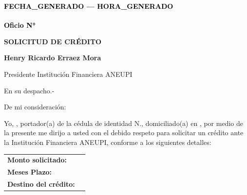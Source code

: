 \documentclass[a4paper,12pt]{article}
\begin{document}
\pagestyle{empty}

\vspace*{-5.5cm}
\begin{flushright}
{\footnotesize \textcolor{black}{\textbf{{{FECHA_GENERADO}} --- {{{HORA_GENERADO}}}}}} \\[-10pt] %
{\footnotesize \textcolor{black}{\underline{\hspace{7.5cm}}}} \\[-2pt] %
{\footnotesize \textcolor{black}{\textbf{Oficio N° }}} 
\end{flushright}


\vspace{2.5cm}
\noindent
\hspace*{\dimexpr\textwidth+1cm\relax}


\begin{center}
    \textbf{\large SOLICITUD DE CRÉDITO}
\end{center}

\vspace{0.8cm}

\noindent \textbf{Henry Ricardo Erraez Mora} 

\noindent Presidente Institución Financiera ANEUPI 

\noindent En su despacho.-

\vspace{1cm}

\noindent De mi consideración:

\noindent Yo, \textbf{\underline{\hspace{6cm}}}, portador(a) de la cédula de identidad N.\textbf{\underline{\hspace{4cm}}}, domiciliado(a) en \textbf{\underline{\hspace{8cm}}}, por medio de la presente me dirijo a usted con el debido respeto para solicitar un crédito ante la Institución Financiera ANEUPI, conforme a los siguientes detalles:

\vspace{0.8cm}

\noindent
\begin{tabular}{p{4.5cm} p{8cm}}
\textbf{Monto solicitado:} & \textbf{\underline{\hspace{6cm}}} \\
\textbf{Meses Plazo:} & \textbf{\underline{\hspace{6cm}}} \\
\textbf{Destino del crédito:} & \textbf{\underline{\hspace{6cm}}} \\
\end{tabular}
\end{document}
